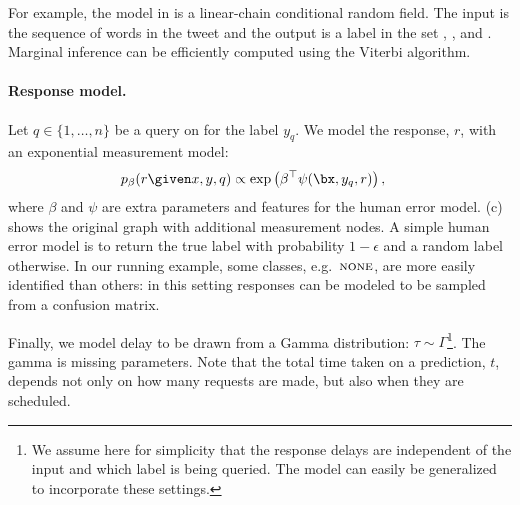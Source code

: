 For example, the model in  is a linear-chain conditional random field. The input is the sequence of words in the tweet and the output is a label in the set \scnone, \scres, \scloc{} and \scper. Marginal inference can be efficiently computed using the Viterbi algorithm.


\paragraph{Response model.}
Let $q \in \{1, \ldots, n\}$ be a query on for the label $y_q$.
We model the response, $r$, with an exponential measurement model:
\begin{align*}
  p_\beta(r \given x, y, q) 
  &\propto \exp \left( \beta^\top\psi(\bx, y_q, r) \right),
\end{align*}
where $\beta$ and $\psi$ are extra parameters and features for the human error model. 
(c) shows the original graph with additional measurement nodes.
A simple human error model is to return the true label with probability $1-\epsilon$ and a random label otherwise.
In our running example, some classes, e.g.\ $\textsc{none}$, are more easily identified than others: in this setting responses can be modeled to be sampled from a confusion matrix.

Finally, we model delay to be drawn from a Gamma distribution: $\tau \sim \Gamma$\footnote{We assume here for simplicity that the response delays are independent of the input and which label is being queried. The model can easily be generalized to incorporate these settings.}.
\ac{The gamma is missing parameters.}
Note that the total time taken on a prediction, $t$, depends not only on how many requests are made, but also when they are scheduled.

